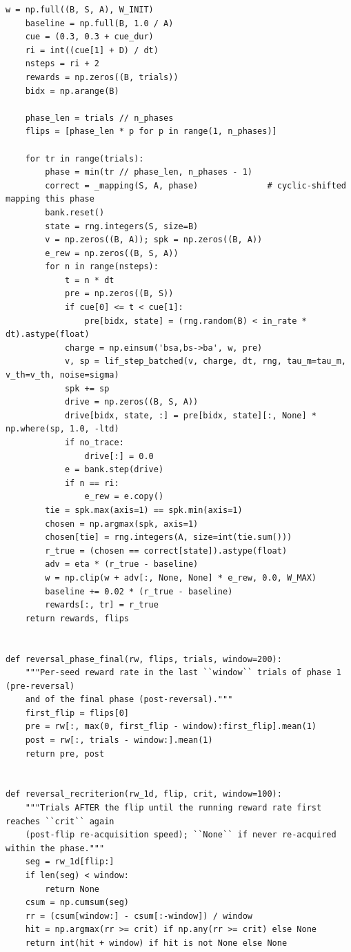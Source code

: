 \begin{lstlisting}[caption={mrl\_trace/bandit.py},label={lst:siox-src-bandit}]
    w = np.full((B, S, A), W_INIT)
    baseline = np.full(B, 1.0 / A)
    cue = (0.3, 0.3 + cue_dur)
    ri = int((cue[1] + D) / dt)
    nsteps = ri + 2
    rewards = np.zeros((B, trials))
    bidx = np.arange(B)

    phase_len = trials // n_phases
    flips = [phase_len * p for p in range(1, n_phases)]

    for tr in range(trials):
        phase = min(tr // phase_len, n_phases - 1)
        correct = _mapping(S, A, phase)              # cyclic-shifted mapping this phase
        bank.reset()
        state = rng.integers(S, size=B)
        v = np.zeros((B, A)); spk = np.zeros((B, A))
        e_rew = np.zeros((B, S, A))
        for n in range(nsteps):
            t = n * dt
            pre = np.zeros((B, S))
            if cue[0] <= t < cue[1]:
                pre[bidx, state] = (rng.random(B) < in_rate * dt).astype(float)
            charge = np.einsum('bsa,bs->ba', w, pre)
            v, sp = lif_step_batched(v, charge, dt, rng, tau_m=tau_m, v_th=v_th, noise=sigma)
            spk += sp
            drive = np.zeros((B, S, A))
            drive[bidx, state, :] = pre[bidx, state][:, None] * np.where(sp, 1.0, -ltd)
            if no_trace:
                drive[:] = 0.0
            e = bank.step(drive)
            if n == ri:
                e_rew = e.copy()
        tie = spk.max(axis=1) == spk.min(axis=1)
        chosen = np.argmax(spk, axis=1)
        chosen[tie] = rng.integers(A, size=int(tie.sum()))
        r_true = (chosen == correct[state]).astype(float)
        adv = eta * (r_true - baseline)
        w = np.clip(w + adv[:, None, None] * e_rew, 0.0, W_MAX)
        baseline += 0.02 * (r_true - baseline)
        rewards[:, tr] = r_true
    return rewards, flips


def reversal_phase_final(rw, flips, trials, window=200):
    """Per-seed reward rate in the last ``window`` trials of phase 1 (pre-reversal)
    and of the final phase (post-reversal)."""
    first_flip = flips[0]
    pre = rw[:, max(0, first_flip - window):first_flip].mean(1)
    post = rw[:, trials - window:].mean(1)
    return pre, post


def reversal_recriterion(rw_1d, flip, crit, window=100):
    """Trials AFTER the flip until the running reward rate first reaches ``crit`` again
    (post-flip re-acquisition speed); ``None`` if never re-acquired within the phase."""
    seg = rw_1d[flip:]
    if len(seg) < window:
        return None
    csum = np.cumsum(seg)
    rr = (csum[window:] - csum[:-window]) / window
    hit = np.argmax(rr >= crit) if np.any(rr >= crit) else None
    return int(hit + window) if hit is not None else None



\end{lstlisting}
